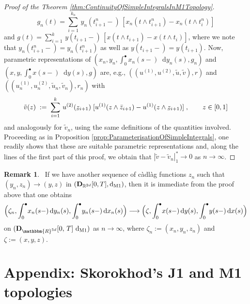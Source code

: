 \documentclass[11pt]{article}
\theoremstyle{definition}\newtheorem{example}[theorem]{Example}
\theoremstyle{definition}\newtheorem{counterexample}[theorem]{Counterexample}
\theoremstyle{definition}\newtheorem{remark}[theorem]{Remark}
\theoremstyle{definition}\newtheorem{defi}[theorem]{Definition}
\numberwithin{equation}{section}
\newcommand{\ubar}[1]{\underaccent{\bar}{#1}}
\newcommand{\R}{\mathbb{R}}
\newcommand{\D}{{\bf D}}											%
\newcommand*\diff{\mathop{}\!\mathrm{d}}								%
\renewcommand{\|}{\; : \, \;}											%
\newcommand{\dM}{\diff_{\operatorname{M1}}}							%
\begin{document}
\begin{proof}[Proof of the Theorem \ref{thm:ContinuityOfSimpleIntegralsInM1Topology}]
	$$ g_n(t) = \sum_{i=1}^{k_n} \, y_n(t_{i+1}^n-) \, [x_n(t \wedge t_{i+1}^n)-x_n(t \wedge t_i^n)] $$
	and $g(t) = \sum_{i=1}^{k} \, y(t_{i+1}-) \,[x(t \wedge t_{i+1})-x(t \wedge t_i)]$, where we note that $y_n(t_{i+1}^n-)=y_n(t_{i+1}^n)$ as well as $y(t_{i+1}-)=y(t_{i+1})$. Now, parametric representations of $(x_n, y_n, \int_0^\bullet x_n(s-) \diff y_n(s), g_n)$ and $(x, y, \int_0^\bullet x(s-) \diff y(s), g)$ are, e.g., $((u^{(1)}, u^{(2)},  \tilde{u}, \tilde{v}), r)$ and $((u_n^{(1)}, u_n^{(2)},  \tilde{u}_n, \tilde{v}_n), r_n)$ with
	\begin{align*}
		\tilde{v}(z) \; := \; \sum_{i=1}^{k} \, u^{(2)}(\ubar{z}_{i+1}) \; [u^{(1)}(z \wedge \bar{z}_{i+1})- u^{(1)}(z \wedge \ubar{z}_{i+1})] \; , \qquad z \in [0,1]
	\end{align*}
	and analogously for $\tilde{v}_n$, using the same definitions of the quantities involved. Proceeding as in Proposition \ref{prop:ParameterisationOfSimpleIntegrals}, one readily shows that these are suitable parametric representations and, along the lines of the first part of this proof, we obtain that $ |\tilde{v}- \tilde{v}_n|^*_1 \to 0 $ as $n\to \infty$.
\end{proof}


\begin{remark}\ 
	If we have another sequence of càdlàg functions $z_n$ such that $(y_n,z_n) \to (y,z)$ in $(\D_{\R^{2d}}[0,T], \dM)$, then it is immediate from the proof above that one obtains 
	$$\Bigl(\zeta_n, \int_0^\bullet \! x_n(s-)\diff y_n(s),\int_0^\bullet  \! y_n(s-) \diff x_n(s)\Bigr) \longrightarrow  \Bigl(\zeta, \int_0^\bullet \! x(s-) \diff y(s),\int_0^\bullet \! y(s-) \diff x(s)\Bigr)$$
	on $(\D_{\mathbbm{R}^{5d}}[0,\,T]\, \dM)$ as $n\to \infty$, where $\zeta_n:=(x_n,y_n,z_n)$ and $\zeta:=(x,y,z)$.
\end{remark}












\appendix


\section{Appendix: Skorokhod's J1 and M1 topologies}\label{app:J1_M1_tops}
\end{document}
